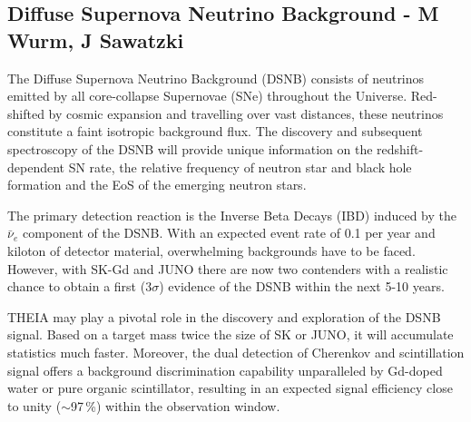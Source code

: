 \subsection{Diffuse Supernova Neutrino Background - M Wurm, J Sawatzki}


The Diffuse Supernova Neutrino Background (DSNB) consists of neutrinos emitted by all core-collapse Supernovae (SNe) throughout the Universe. Red-shifted by cosmic expansion and travelling over vast distances, these neutrinos constitute a faint isotropic background flux. The discovery and subsequent spectroscopy of the DSNB will provide unique information on the redshift-dependent SN rate, the relative frequency of neutron star and black hole formation and the EoS of the emerging neutron stars.

The primary detection reaction is the Inverse Beta Decays (IBD) induced by the $\bar\nu_e$ component of the DSNB. With an expected event rate of 0.1 per year and kiloton of detector material, overwhelming backgrounds have to be faced. However, with SK-Gd and JUNO there are now two contenders with a realistic chance to obtain a first ($3\sigma$) evidence of the DSNB within the next 5-10 years.



THEIA may play a pivotal role in the discovery and exploration of the DSNB signal. Based on a target mass twice the size of SK or JUNO, it will accumulate statistics much faster. Moreover, the dual detection of Cherenkov and scintillation signal offers a background discrimination capability unparalleled by Gd-doped water or pure organic scintillator, resulting in an expected signal efficiency close to unity ($\sim$97\,\%) within the observation window. 

